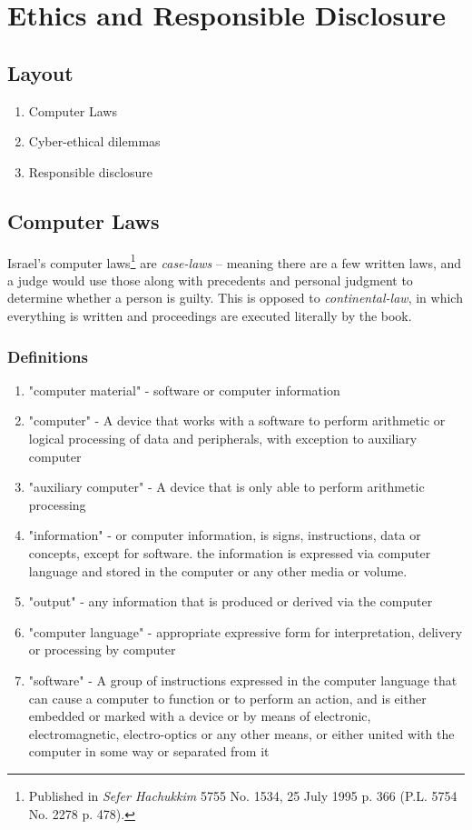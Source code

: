 \chapter{Ethics and Responsible Disclosure} \label{ethics_chapter}

\section*{Layout}

\begin{enumerate}
    \item Computer Laws
    \item Cyber-ethical dilemmas
    \item Responsible disclosure
\end{enumerate}

\section{Computer Laws}\label{sec:comp_laws}

Israel's computer laws\footnote{Published in \emph{Sefer Hachukkim} 5755 No. 1534, 25 July 1995 p. 366 (P.L. 5754 No. 2278 p. 478).}
are \textit{case-laws} – meaning there are a few written
laws, and a judge would use those along with precedents and personal judgment to
determine whether a person is guilty. This is opposed to
\textit{continental-law}, in which everything is written and proceedings are
executed literally by the book.

\subsection{Definitions}
\begin{enumerate}
    \item "computer material" - software or computer information
    \item "computer" - A device that works with a software to perform arithmetic or logical processing of data and peripherals, with exception to auxiliary computer
    \item "auxiliary computer" - A device that is only able to perform arithmetic processing
    \item "information" - or computer information, is signs, instructions, data or concepts, except for software. the information is expressed via computer language and stored in the computer or any other media or volume.
    \item "output" - any information that is produced or derived via the computer
    \item "computer language" - appropriate expressive form for interpretation, delivery or processing by computer
    \item "software" - A group of instructions expressed in the computer language that can cause a computer to function or to perform an action, and is either embedded or marked with a device or by means of electronic, electromagnetic, electro-optics or any other means, or either united with the computer in some way or separated from it
\end{enumerate}


